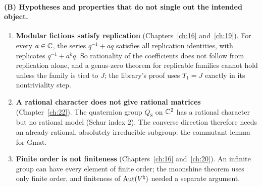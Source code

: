 \paragraph{(B) Hypotheses and properties that do not single out the intended object.}
\begin{enumerate}
\item \textbf{Modular fictions satisfy replication} (Chapters~\ref{ch:16} and~\ref{ch:19}). For every $a\in{\mathbb{C}}$, the series
  $q^{-1}+aq$ satisfies all replication identities, with replicates $q^{-1}+a^kq$. So rationality of the coefficients does
  not follow from replication alone, and a genus-zero theorem for replicable families cannot hold unless the family is
  tied to $J$; the library's proof uses $T_1=J$ exactly in its nontriviality step.
\item \textbf{A rational character does not give rational matrices} (Chapter~\ref{ch:22}). The quaternion group $Q_8$ on
  ${\mathbb{C}}^2$ has a rational character but no rational model (Schur index $2$). The converse direction therefore needs an
  already rational, absolutely irreducible subgroup: the commutant lemma for $\mathrm{Gmat}$.
\item \textbf{Finite order is not finiteness} (Chapters~\ref{ch:16} and~\ref{ch:20}). An infinite group can have every
  element of finite order; the moonshine theorem uses only finite order, and finiteness of $\operatorname{Aut}({V^{\natural}})$ needed a
  separate argument.
\end{enumerate}


